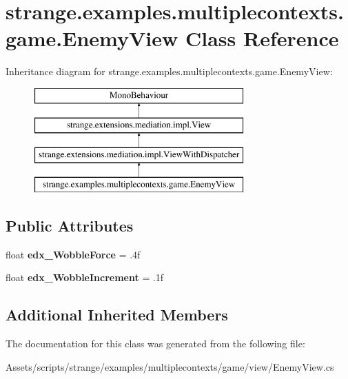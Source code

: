 \hypertarget{classstrange_1_1examples_1_1multiplecontexts_1_1game_1_1_enemy_view}{\section{strange.\-examples.\-multiplecontexts.\-game.\-Enemy\-View Class Reference}
\label{classstrange_1_1examples_1_1multiplecontexts_1_1game_1_1_enemy_view}
}
Inheritance diagram for strange.\-examples.\-multiplecontexts.\-game.\-Enemy\-View\-:\begin{figure}[H]
\begin{center}
\leavevmode
\includegraphics[height=4.000000cm]{classstrange_1_1examples_1_1multiplecontexts_1_1game_1_1_enemy_view}
\end{center}
\end{figure}
\subsection*{Public Attributes}
\begin{DoxyCompactItemize}
\item 
\hypertarget{classstrange_1_1examples_1_1multiplecontexts_1_1game_1_1_enemy_view_aabc99af4d2597dd1a7d8ed9e05221b5c}{float {\bfseries edx\-\_\-\-Wobble\-Force} = .\-4f}\label{classstrange_1_1examples_1_1multiplecontexts_1_1game_1_1_enemy_view_aabc99af4d2597dd1a7d8ed9e05221b5c}

\item 
\hypertarget{classstrange_1_1examples_1_1multiplecontexts_1_1game_1_1_enemy_view_a422c138020f01445dabbad26779f51fa}{float {\bfseries edx\-\_\-\-Wobble\-Increment} = .\-1f}\label{classstrange_1_1examples_1_1multiplecontexts_1_1game_1_1_enemy_view_a422c138020f01445dabbad26779f51fa}

\end{DoxyCompactItemize}
\subsection*{Additional Inherited Members}


The documentation for this class was generated from the following file\-:\begin{DoxyCompactItemize}
\item 
Assets/scripts/strange/examples/multiplecontexts/game/view/Enemy\-View.\-cs\end{DoxyCompactItemize}

